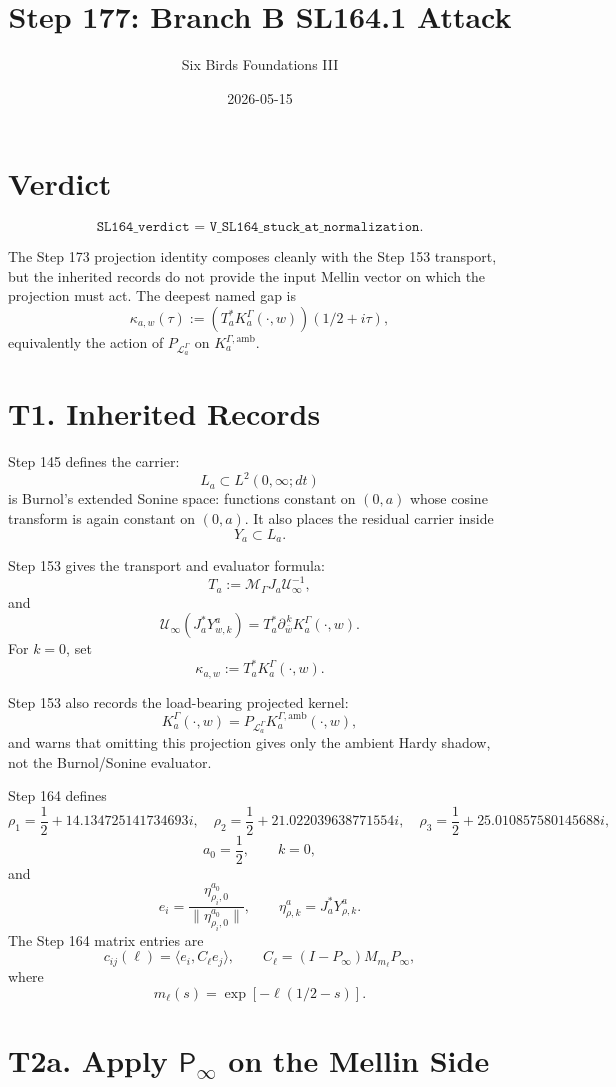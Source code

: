 \documentclass[11pt]{article}
\title{Step 177: Branch B SL164.1 Attack}
\author{Six Birds Foundations III}
\date{2026-05-15}
\newcommand{\Psym}{\mathsf P_\infty}
\newcommand{\Uinf}{\mathcal U_\infty}
\newcommand{\MGamma}{\mathcal M_\Gamma}
\newcommand{\Cell}{C_\ell}
\begin{document}
\maketitle

\section{Verdict}

\[
\boxed{\texttt{SL164\_verdict = V\_SL164\_stuck\_at\_normalization}.}
\]

The Step 173 projection identity composes cleanly with the Step 153 transport,
but the inherited records do not provide the input Mellin vector on which the
projection must act.  The deepest named gap is
\[
\boxed{
\kappa_{a,w}(\tau)
:=
\left(T_a^*K_a^\Gamma(\cdot,w)\right)(1/2+i\tau),
}
\]
equivalently the action of \(P_{\mathcal L_a^\Gamma}\) on
\(K_a^{\Gamma,\mathrm{amb}}\).

\section{T1. Inherited Records}

Step 145 defines the carrier:
\[
L_a\subset L^2(0,\infty;dt)
\]
is Burnol's extended Sonine space: functions constant on \((0,a)\) whose
cosine transform is again constant on \((0,a)\).  It also places the residual
carrier inside
\[
Y_a\subset L_a.
\]

Step 153 gives the transport and evaluator formula:
\[
T_a:=\MGamma J_a\Uinf^{-1},
\]
and
\[
\Uinf(J_a^*Y^a_{w,k})
=
T_a^*\partial_{\overline w}^{\,k}K_a^\Gamma(\cdot,w).
\]
For \(k=0\), set
\[
\kappa_{a,w}:=T_a^*K_a^\Gamma(\cdot,w).
\]

Step 153 also records the load-bearing projected kernel:
\[
K_a^\Gamma(\cdot,w)
=
P_{\mathcal L_a^\Gamma}
K_a^{\Gamma,\mathrm{amb}}(\cdot,w),
\]
and warns that omitting this projection gives only the ambient Hardy shadow,
not the Burnol/Sonine evaluator.

Step 164 defines
\[
\rho_1=\frac12+14.134725141734693i,\quad
\rho_2=\frac12+21.022039638771554i,\quad
\rho_3=\frac12+25.010857580145688i,
\]
\[
a_0=\frac12,\qquad k=0,
\]
and
\[
e_i=\frac{\eta^{a_0}_{\rho_i,0}}
{\|\eta^{a_0}_{\rho_i,0}\|},
\qquad
\eta^a_{\rho,k}=J_a^*Y^a_{\rho,k}.
\]
The Step 164 matrix entries are
\[
c_{ij}(\ell)=\langle e_i,\Cell e_j\rangle,
\qquad
\Cell=(I-P_\infty)M_{m_\ell}P_\infty,
\]
where
\[
m_\ell(s)=\exp[-\ell(1/2-s)].
\]

\section{T2a. Apply \(\Psym\) on the Mellin Side}
\end{document}
